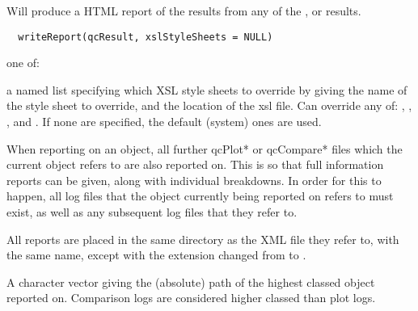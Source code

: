 \documentclass[a4paper,oneside]{book}
\begin{document}
\begin{Description}\relax
Will produce a HTML report of the results from any of the
, or  results.
\end{Description}
\begin{Usage}
\begin{verbatim}
  writeReport(qcResult, xslStyleSheets = NULL)
\end{verbatim}
\end{Usage}
\begin{Arguments}
\begin{ldescription}
\item[\code{qcResult}] one of:

\item[\code{xslStyleSheets}] a named list specifying which XSL style sheets
to override by giving the name of the style sheet to override, and
the location of the xsl file. Can override any of:
, ,
, and .
If none are specified, the default (system) ones are used.

\end{ldescription}
\end{Arguments}
\begin{Details}\relax
When reporting on an object, all further qcPlot* or qcCompare* files
which the current object refers to are also reported on. This is so
that full information reports can be given, along with individual
breakdowns. In order for this to happen, all log files that
the object currently being reported on refers to must exist, as well
as any subsequent log files that they refer to.

All reports are placed in the same directory as the XML file they
refer to, with the same name, except with the extension changed from
 to .
\end{Details}
\begin{Value}
A character vector giving the (absolute) path of the highest classed
object reported on. Comparison logs are considered higher classed than
plot logs.
\end{Value}
\end{document}
